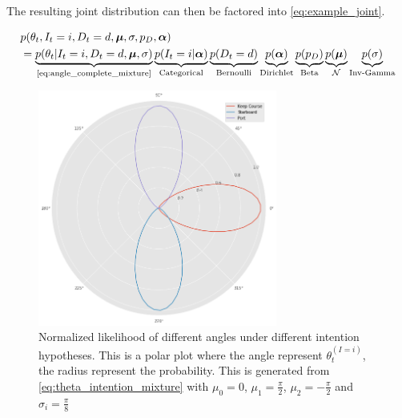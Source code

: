 The resulting joint distribution can then be factored into \cref{eq:example_joint}.

\begin{align}\label{eq:example_joint}
\begin{split}
    &p(\theta_t, I_t=i, D_t=d, \boldsymbol{\mu}, \sigma, p_D, \boldsymbol{\alpha})\\
    &= \underbrace{p(\theta_t | I_t=i, D_t=d, \boldsymbol{\mu}, \sigma)}_{\text{\cref{eq:angle_complete_mixture}}}\underbrace{p(I_t=i | \boldsymbol{\alpha})}_{\text{Categorical}}\underbrace{p(D_t=d)}_{\text{Bernoulli}}\underbrace{p(\boldsymbol{\alpha})}_{\text{Dirichlet}}\underbrace{p(p_D)}_{\text{Beta}}\underbrace{p(\boldsymbol{\mu})}_{\mathcal{N}} \underbrace{p(\sigma)}_{\text{Inv-Gamma}}
\end{split}
\end{align}


\begin{figure}
    \centering
    \includegraphics[width=0.7\textwidth]{figures/intention_angle.png}
    \caption{Normalized likelihood of different angles under different intention hypotheses. This is a polar plot where the angle represent $\theta_t^{(I=i)}$, the radius represent the probability. This is generated from \cref{eq:theta_intention_mixture} with $\mu_0=0$, $\mu_1 = \frac{\pi}{2}$, $\mu_2=-\frac{\pi}{2}$ and $\sigma_i=\frac{\pi}{8}$}
    \label{fig:intention_angle}
\end{figure}

